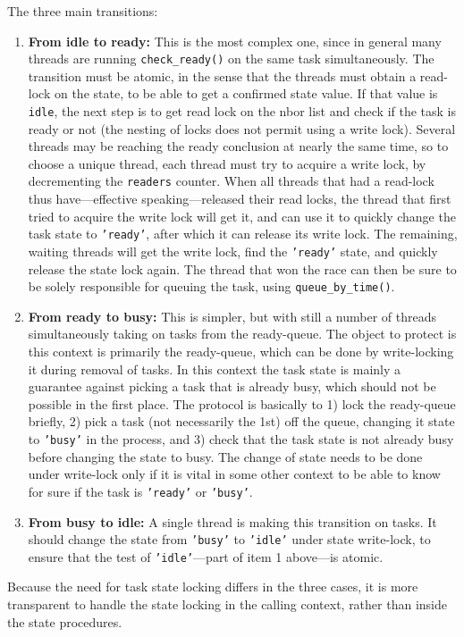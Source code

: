 \documentclass[paper=a4,fontsize=11pt]{scrartcl}
\numberwithin{equation}{section}		%
\numberwithin{figure}{section}			%
\numberwithin{table}{section}				%
\newcommand{\codecolor}{\color{Blue}}
\newcommand{\Code}[1]{{\codecolor\texttt{#1}}}
\def\checkready{\Code{check\_ready()}}
\def\queuebytime{\Code{queue\_by\_time()}}
\begin{document}
The three main transitions:
\begin{enumerate}
\item \textbf{From idle to ready:} This is the most complex one, since in general many threads are running \checkready{} on the same task simultaneously.
    The transition must be atomic, in the sense that the threads must obtain a read-lock on the state, to be able to get a confirmed state value.  If that value is \Code{idle}, the next step is to get read lock on the nbor list and check if the task is ready or not (the nesting of locks does not permit using a write lock).  Several threads may be reaching the ready conclusion at nearly the same time, so to choose a unique thread, each thread must try to acquire a write lock, by decrementing the \Code{readers} counter.  When all threads that had a read-lock thus have---effective speaking---released their read locks, the thread that first tried to acquire the write lock will get it, and can use it to quickly change the task state to \Code{'ready'}, after which it can release its write lock.  The remaining, waiting threads will get the write lock, find the \Code{'ready'} state, and quickly release the state lock again.  The thread that won the race can then be sure to be solely responsible for queuing the task, using \queuebytime{}.
    
\item \textbf{From ready to busy:} This is simpler, but with still a number of threads simultaneously taking on tasks from the ready-queue.
    The object to protect is this context is primarily the ready-queue, which can be done by write-locking it during removal of tasks.  In this context the task state is mainly a guarantee against picking a task that is already busy, which should not be possible in the first place. The protocol is basically to 1) lock the ready-queue briefly, 2) pick a task (not necessarily the 1st) off the queue, changing it state to \Code{'busy'} in the process, and 3) check that the task state is not already busy before changing the state to busy.  The change of state needs to be done under write-lock only if it is vital in some other context to be able to know for sure if the task is \Code{'ready'} or \Code{'busy'}.

\item \textbf{From busy to idle:} A single thread is making this transition on tasks.
    It should change the state from \Code{'busy'} to \Code{'idle'} under state write-lock, to ensure that the test of \Code{'idle'}---part of item 1 above---is atomic.
\end{enumerate}
Because the need for task state locking differs in the three cases, it is more transparent to handle the state locking in the calling context, rather than inside the state procedures.
\end{document}
